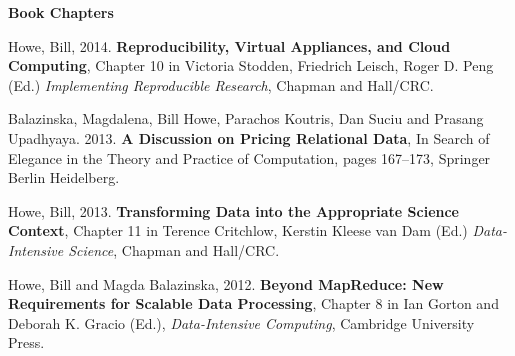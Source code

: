 {\bf Book Chapters}

\begin{bulletlist}

\item Howe, Bill, 2014. \textbf{Reproducibility, Virtual Appliances, and Cloud Computing}, 
Chapter 10 in Victoria Stodden, Friedrich Leisch, Roger D. Peng (Ed.) 
\emph{Implementing Reproducible Research}, Chapman and Hall/CRC.

\item Balazinska, Magdalena, Bill Howe, Parachos Koutris, Dan Suciu and Prasang Upadhyaya. 2013. 
\textbf{A Discussion on Pricing Relational Data}, In Search of Elegance in the Theory and Practice of Computation, pages 167--173, Springer Berlin Heidelberg.

\item Howe, Bill, 2013. 
\textbf{Transforming Data into the Appropriate Science Context}, Chapter 11 in Terence Critchlow, Kerstin Kleese van Dam (Ed.) \emph{Data-Intensive Science}, 
Chapman and Hall/CRC.

\item Howe, Bill and Magda Balazinska, 2012. 
\textbf{Beyond MapReduce: New Requirements for Scalable Data Processing}, Chapter 8 in Ian Gorton and Deborah K. Gracio (Ed.), \emph{Data-Intensive Computing}, Cambridge University Press.

\end{bulletlist}

